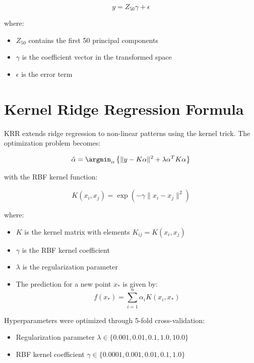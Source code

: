 \documentclass{article}
\begin{document}
\begin{appendices}
\begin{equation}
    y = Z_{50}\gamma + \epsilon
\end{equation}

where:
\begin{itemize}
    \item $Z_{50}$ contains the first 50 principal components
    \item $\gamma$ is the coefficient vector in the transformed space
    \item $\epsilon$ is the error term
\end{itemize}

\section{Kernel Ridge Regression Formula} \label{app:krr_regression}
KRR extends ridge regression to non-linear patterns using the kernel trick. The optimization problem becomes:

\begin{equation}
    \hat{\alpha} = \argmin_{\alpha} \left\{ \|y - K\alpha\|^2 + \lambda\alpha^T K\alpha \right\}
\end{equation}

with the RBF kernel function:

\begin{equation}
    K(x_i, x_j) = \exp\left(-\gamma\|x_i - x_j\|^2\right)
\end{equation}

where:
\begin{itemize}
    \item $K$ is the kernel matrix with elements $K_{ij} = K(x_i, x_j)$
    \item $\gamma$ is the RBF kernel coefficient
    \item $\lambda$ is the regularization parameter
    \item The prediction for a new point $x_*$ is given by:
    \begin{equation}
        f(x_*) = \sum_{i=1}^n \alpha_i K(x_i, x_*)
    \end{equation}
\end{itemize}

Hyperparameters were optimized through 5-fold cross-validation:
\begin{itemize}
    \item Regularization parameter $\lambda \in \{0.001, 0.01, 0.1, 1.0, 10.0\}$
    \item RBF kernel coefficient $\gamma \in \{0.0001, 0.001, 0.01, 0.1, 1.0\}$
\end{itemize}


\end{appendices}
\end{document}
